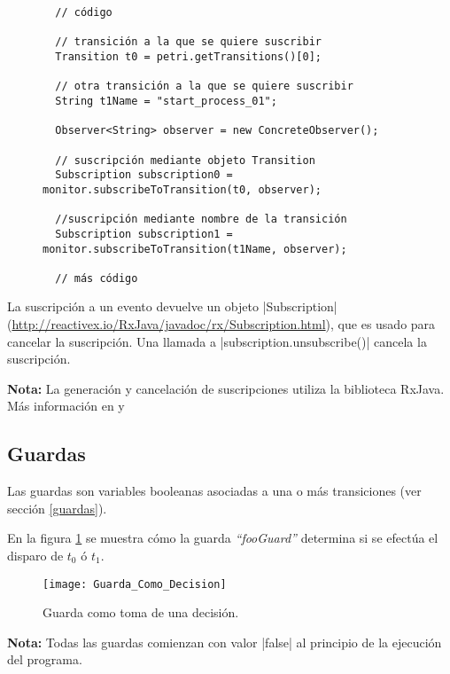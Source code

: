 \begin{figure}[H]
\centering
\begin{verbatim}
  // código
  
  // transición a la que se quiere suscribir
  Transition t0 = petri.getTransitions()[0]; 
  
  // otra transición a la que se quiere suscribir
  String t1Name = "start_process_01";
  
  Observer<String> observer = new ConcreteObserver();
  
  // suscripción mediante objeto Transition
  Subscription subscription0 = monitor.subscribeToTransition(t0, observer);
  
  //suscripción mediante nombre de la transición
  Subscription subscription1 = monitor.subscribeToTransition(t1Name, observer);
  
  // más código
\end{verbatim}
\end{figure}

La suscripción a un evento devuelve un objeto |Subscription|
(\url{http://reactivex.io/RxJava/javadoc/rx/Subscription.html}),
que es usado para cancelar la suscripción.
Una llamada a |subscription.unsubscribe()| cancela la suscripción.

\begin{framed}
\textbf{Nota:} La generación y cancelación de suscripciones utiliza la
biblioteca RxJava. Más información en \cite{RxJava} y \cite{RxJavaJavadoc}
\end{framed}

\subsection{Guardas}
\label{sec:guardas_monitor}
Las guardas son variables booleanas asociadas a una o más transiciones (ver
sección \ref{guardas}).

En la figura \ref{fig:guarda_como_decision} se muestra cómo la guarda
\textit{``fooGuard''} determina si se efectúa el disparo de $t_{0}$ ó $t_{1}$.

\begin{figure}[H]
  \centering
  \texttt{[image: Guarda\_Como\_Decision]}
  \caption{Guarda como toma de una decisión.}
  \label{fig:guarda_como_decision}
\end{figure}

\begin{framed}
\textbf{Nota:} Todas las guardas comienzan con valor |false| al
principio de la ejecución del programa.
\end{framed}

